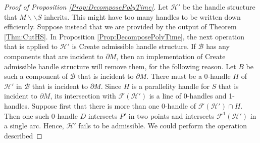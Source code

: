 \documentclass[oneside]{amsart}
\numberwithin{equation}{section}
\theoremstyle{plain}
\theoremstyle{definition}
\newcommand{\cut}{\backslash\backslash}
\newcommand{\calH}{\mathcal{H}}
\newcommand{\calB}{\mathcal{B}}
\newcommand{\calF}{\mathcal{F}}
\begin{document}
\begin{proof}[Proof of Proposition \ref{Prop:DecomposePolyTime}]
Let $\calH'$ be the handle structure that $M \cut S$ inherits. This might have too many handles to be written down efficiently.
Suppose instead that we are provided by the output of Theorem \ref{Thm:CutHS}.
In Proposition \ref{Prop:DecomposePolyTime}, the next operation that is applied to $\calH'$ is {\sc Create admissible handle structure}. If $\calB$ has any components
that are incident to $\partial M$, then an implementation of {\sc Create admissible handle structure} will remove them, for the following reason.
Let $B$ be such a component of $\calB$ that is incident to $\partial M$. There must be a 0-handle $H$ of $\calH'$ in $\calB$ that
is incident to $\partial M $. Since $H$ is a parallelity handle for $S$ that is incident to $\partial M$, its intersection with $\calF(\calH')$ is a line of 0-handles and 1-handles. Suppose first that there is more than one
0-handle of $\calF(\calH') \cap H$. Then one such 0-handle $D$ intersects $P'$ in two points and intersects $\calF^1(\calH')$ in a single arc. 
Hence, $\calH'$ fails to be admissible. We could perform the operation described

\end{proof}
\end{document}
